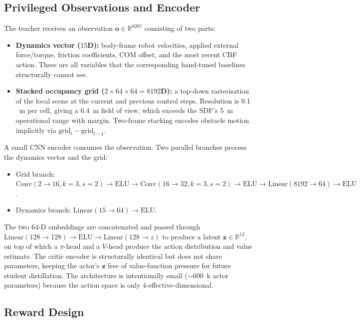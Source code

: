 \documentclass{article}
\newcommand{\R}{\mathbb{R}}
\newcommand{\bo}{\mathbf{o}}
\newcommand{\bz}{\mathbf{z}}
\begin{document}
\subsection{Privileged Observations and Encoder}

The teacher receives an observation $\bo \in \R^{8207}$ consisting of two
parts:
\begin{itemize}[leftmargin=*,itemsep=2pt,topsep=2pt]
\item \textbf{Dynamics vector ($15$D):} body-frame robot velocities, applied
      external force/torque, friction coefficients, COM offset, and the most
      recent CBF action. These are all variables that the corresponding
      hand-tuned baselines structurally cannot see.
\item \textbf{Stacked occupancy grid ($2\times 64\times 64 = 8192$D):} a
      top-down rasterisation of the local scene at the current and previous
      control steps. Resolution is $0.1$~m per cell, giving a $6.4$~m
      field of view, which exceeds the SDF's $5$~m operational range with
      margin. Two-frame stacking encodes obstacle motion implicitly via
      $\text{grid}_t - \text{grid}_{t-1}$.
\end{itemize}
A small CNN encoder consumes the observation. Two parallel branches process
the dynamics vector and the grid:
\begin{itemize}[leftmargin=*,itemsep=2pt,topsep=2pt]
\item Grid branch: $\mathrm{Conv}(2\to16, k{=}3, s{=}2) \to \mathrm{ELU} \to
      \mathrm{Conv}(16\to32, k{=}3, s{=}2) \to \mathrm{ELU} \to
      \mathrm{Linear}(8192\to64) \to \mathrm{ELU}$.
\item Dynamics branch: $\mathrm{Linear}(15\to64) \to \mathrm{ELU}$.
\end{itemize}
The two $64$-D embeddings are concatenated and passed through
$\mathrm{Linear}(128\to128)\to\mathrm{ELU}\to\mathrm{Linear}(128\to z)$ to
produce a latent $\bz \in \R^{12}$, on top of which a $\pi$-head and a
$V$-head produce the action distribution and value estimate. The critic
encoder is structurally identical but does not share parameters, keeping the
actor's $\bz$ free of value-function pressure for future student
distillation. The architecture is intentionally small ($\sim 600$~k actor
parameters) because the action space is only $4$-effective-dimensional.

\subsection{Reward Design}
\end{document}
